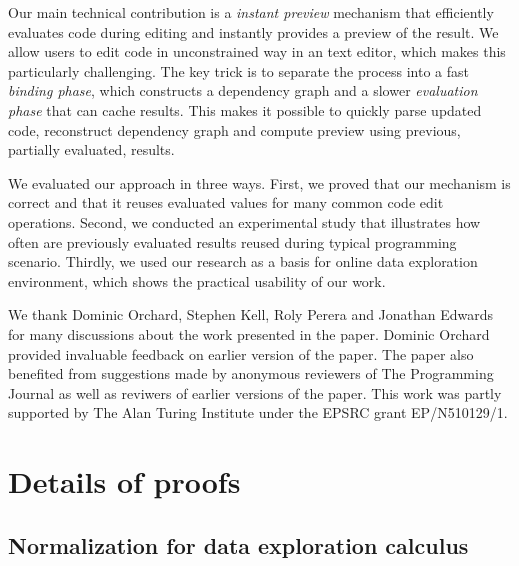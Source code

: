 \documentclass[english,crc,references=cleveref]{programming}
\theoremstyle{plain}
\theoremstyle{definition}
\begin{document}
Our main technical contribution is a \emph{instant preview} mechanism that efficiently evaluates
code during editing and instantly provides a preview of the result. We allow users to edit code
in unconstrained way in an text editor, which makes this particularly challenging. The key trick
is to separate the process into a fast \emph{binding phase}, which constructs a dependency graph
and a slower \emph{evaluation phase} that can cache results. This makes it possible to quickly parse
updated code, reconstruct dependency graph and compute preview using previous, partially
evaluated, results.

We evaluated our approach in three ways. First, we proved that our mechanism is correct and
that it reuses evaluated values for many common code edit operations. Second, we conducted an
experimental study that illustrates how often are previously evaluated results reused during
typical programming scenario. Thirdly, we used our research as a basis for online data exploration
environment, which shows the practical usability of our work.

\acks
\begin{sloppypar}
 We thank Dominic Orchard, Stephen Kell, Roly Perera and Jonathan
  Edwards for many discussions about the work presented in the paper. Dominic
  Orchard provided invaluable feedback on earlier version of the paper. The
  paper also benefited from suggestions made by anonymous reviewers of The
  Programming Journal as well as reviwers of earlier versions of the paper.
  This work was partly supported by The Alan Turing Institute under the EPSRC
  grant EP/N510129/1.
\end{sloppypar}

\printbibliography


\appendix

\section{Details of proofs}

\subsection{Normalization for data exploration calculus}
\label{sec:app-normalization}
\end{document}
